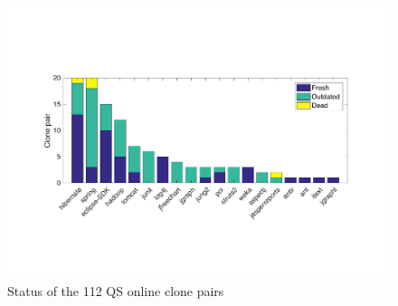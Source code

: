 \documentclass[sigconf,review, anonymous]{acmart}
\begin{document}

\begin{figure}
	\centering
	\includegraphics[width=\linewidth]{freshness}
	\caption{Status of the 112 QS online clone pairs}
	\label{fig:outdated}
\end{figure}
\end{document}
